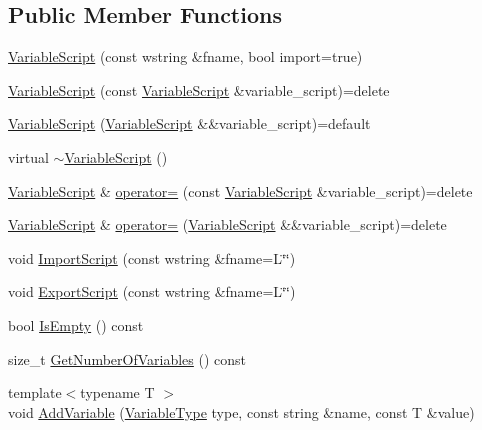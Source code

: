 \subsection*{Public Member Functions}
\begin{DoxyCompactItemize}
\item 
\hyperlink{classmage_1_1_variable_script_a4b4028a9710fcfc5fb26bb63922a90cb}{Variable\+Script} (const wstring \&fname, bool import=true)
\item 
\hyperlink{classmage_1_1_variable_script_aebd4e6cf2bdae4e57c9da428007fc4d7}{Variable\+Script} (const \hyperlink{classmage_1_1_variable_script}{Variable\+Script} \&variable\+\_\+script)=delete
\item 
\hyperlink{classmage_1_1_variable_script_ac638aa59a2cb235d20a96d5a4dfd619d}{Variable\+Script} (\hyperlink{classmage_1_1_variable_script}{Variable\+Script} \&\&variable\+\_\+script)=default
\item 
virtual \hyperlink{classmage_1_1_variable_script_ae7026e1283b1a1164f02fdc3e1f2b829}{$\sim$\+Variable\+Script} ()
\item 
\hyperlink{classmage_1_1_variable_script}{Variable\+Script} \& \hyperlink{classmage_1_1_variable_script_ae090b066ea939fc6611e77a47df6a97f}{operator=} (const \hyperlink{classmage_1_1_variable_script}{Variable\+Script} \&variable\+\_\+script)=delete
\item 
\hyperlink{classmage_1_1_variable_script}{Variable\+Script} \& \hyperlink{classmage_1_1_variable_script_a4602887cc8b6c45a169af7822cf744a1}{operator=} (\hyperlink{classmage_1_1_variable_script}{Variable\+Script} \&\&variable\+\_\+script)=delete
\item 
void \hyperlink{classmage_1_1_variable_script_aaa35ef65eb958e47734c1b1fa2802712}{Import\+Script} (const wstring \&fname=L\char`\"{}\char`\"{})
\item 
void \hyperlink{classmage_1_1_variable_script_aa9b2514cd91bfde6a336c9487b91de53}{Export\+Script} (const wstring \&fname=L\char`\"{}\char`\"{})
\item 
bool \hyperlink{classmage_1_1_variable_script_a8ae619cdc5519a753780360abab87430}{Is\+Empty} () const
\item 
size\+\_\+t \hyperlink{classmage_1_1_variable_script_ad0bcb7dbb42f705f475c64feb1063fb4}{Get\+Number\+Of\+Variables} () const
\item 
{\footnotesize template$<$typename T $>$ }\\void \hyperlink{classmage_1_1_variable_script_a981ec417c40c5b010fc2199a7aa44f95}{Add\+Variable} (\hyperlink{namespacemage_a530428e73bac0ba7fe84b29086a9e33a}{Variable\+Type} type, const string \&name, const T \&value)

\end{DoxyCompactItemize}
